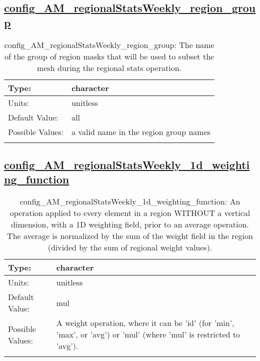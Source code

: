 \subsection[config\_AM\_regionalStatsWeekly\_region\_group]{\hyperref[sec:nm_tab_AM_regionalStatsWeekly]{config\_AM\_regionalStatsWeekly\_region\_group}}
\label{subsec:nm_sec_config_AM_regionalStatsWeekly_region_group}
\begin{center}
\begin{longtable}{| p{2.0in} || p{4.0in} |}
    \hline
    Type: & character \\
    \hline
    Units: & \si{unitless} \\
    \hline
    Default Value: & all \\
    \hline
    Possible Values: & a valid name in the region group names \\
    \hline
    \caption{config\_AM\_regionalStatsWeekly\_region\_group: The name of the group of region masks that will be used to subset the mesh during the regional stats operation.}
\end{longtable}
\end{center}
\subsection[config\_AM\_regionalStatsWeekly\_1d\_weighting\_function]{\hyperref[sec:nm_tab_AM_regionalStatsWeekly]{config\_AM\_regionalStatsWeekly\_1d\_weighting\_function}}
\label{subsec:nm_sec_config_AM_regionalStatsWeekly_1d_weighting_function}
\begin{center}
\begin{longtable}{| p{2.0in} || p{4.0in} |}
    \hline
    Type: & character \\
    \hline
    Units: & \si{unitless} \\
    \hline
    Default Value: & mul \\
    \hline
    Possible Values: & A weight operation, where it can be 'id' (for 'min', 'max', or 'avg') or 'mul' (where 'mul' is restricted to 'avg'). \\
    \hline
    \caption{config\_AM\_regionalStatsWeekly\_1d\_weighting\_function: An operation applied to every element in a region WITHOUT a vertical dimension, with a 1D weighting field, prior to an average operation. The average is normalized by the sum of the weight field in the region (divided by the sum of regional weight values).}
\end{longtable}
\end{center}
